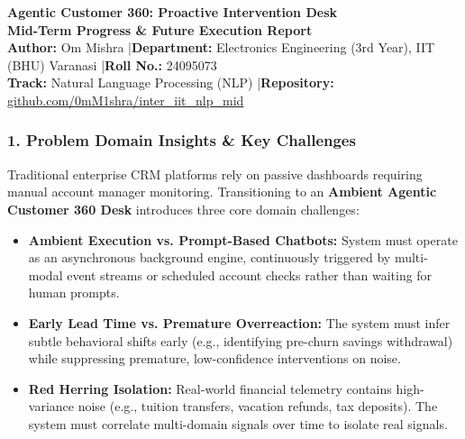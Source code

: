 \documentclass[10pt,a4paper]{article}
\begin{document}
\begin{center}
    {\LARGE \bfseries \color{primary} Agentic Customer 360: Proactive Intervention Desk}\\[3pt]
    {\large \bfseries Mid-Term Progress \& Future Execution Report}\\[4pt]
    {\small \textbf{Author:} Om Mishra \quad|\quad \textbf{Department:} Electronics Engineering (3rd Year), IIT (BHU) Varanasi \quad|\quad \textbf{Roll No.:} 24095073}\\[2pt]
    {\small \textbf{Track:} Natural Language Processing (NLP) \quad|\quad \textbf{Repository:} \href{https://github.com/0mM1shra/inter_iit_nlp_mid}{github.com/0mM1shra/inter\_iit\_nlp\_mid}}
\end{center}
\vspace{-4pt}

\noindent{\color{primary}\rule{\textwidth}{1pt}}
\vspace{-6pt}

\subsubsection*{\color{primary} 1. Problem Domain Insights \& Key Challenges}
Traditional enterprise CRM platforms rely on passive dashboards requiring manual account manager monitoring. Transitioning to an \textbf{Ambient Agentic Customer 360 Desk} introduces three core domain challenges:
\begin{itemize}
    \item \textbf{Ambient Execution vs. Prompt-Based Chatbots:} System must operate as an asynchronous background engine, continuously triggered by multi-modal event streams or scheduled account checks rather than waiting for human prompts.
    \item \textbf{Early Lead Time vs. Premature Overreaction:} The system must infer subtle behavioral shifts early (e.g., identifying pre-churn savings withdrawal) while suppressing premature, low-confidence interventions on noise.
    \item \textbf{Red Herring Isolation:} Real-world financial telemetry contains high-variance noise (e.g., tuition transfers, vacation refunds, tax deposits). The system must correlate multi-domain signals over time to isolate real signals.
\end{itemize}
\end{document}
